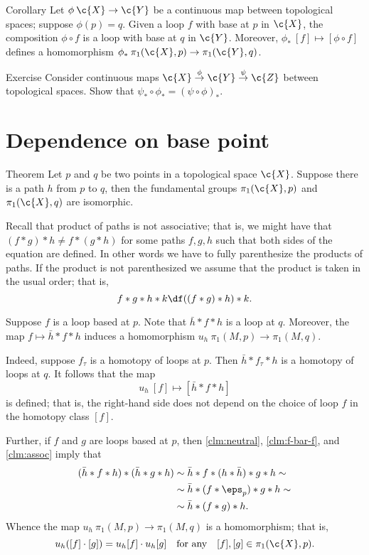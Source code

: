 \begin{thm}{Corollary}
Let $\phi\:\c{X}\to \c{Y}$ be a continuous map between topological spaces;
suppose $\phi(p)=q$.
Given a loop $f$ with base at $p$ in $\c{X}$, the composition $\phi\circ f$ is a loop with base at $q$ in $\c{Y}$.
Moreover, 
$\phi_*\:[f]\mapsto [\phi\circ f]$
defines a homomorphism $\phi_*\:\pi_1(\c{X},p)\to \pi_1(\c{Y},q)$.
\end{thm}



\begin{thm}{Exercise}
Consider continuous maps 
$\c{X}\stackrel{\phi}{\to}\c{Y}\stackrel{\psi}{\to}\c{Z}$ between topological spaces.
Show that $\psi_*\circ\phi_*=(\psi\circ\phi)_*$.
\end{thm}

\section{Dependence on base point}

\begin{thm}{Theorem}
Let $p$ and $q$ be two points in a topological space $\c{X}$.
Suppose there is a path $h$ from $p$ to $q$, then 
the fundamental groups $\pi_1(\c{X},p)$ and $\pi_1(\c{X},q)$ are isomorphic.
\end{thm}

Recall that product of paths is not associative;
that is, we might have that $(f*g)*h\ne f*(g*h)$ for some paths $f,g,h$ such that both sides of the equation are defined.
In other words we have to fully parenthesize the products of paths.
If the product is not parenthesized we assume that the product is taken in the usual order;
that is,
\[f*g*h*k\df((f*g)*h)*k.\]

Suppose $f$ is a loop based at $p$.
Note that $\bar h*f*h$ is a loop at $q$.
Moreover, the map $f\mapsto \bar h*f*h$ induces a homomorphism $u_h\:\pi_1(M,p)\to\pi_1(M,q)$.

Indeed, suppose $f_\tau$ is a homotopy of loops at $p$.
Then $\bar h*f_\tau*h$ is a homotopy of loops at $q$.
It follows that the map 
\[u_h\:[f]\mapsto [\bar h*f*h]\]
is defined; that is, the right-hand side does not depend on the choice of loop $f$ in the homotopy class $[f]$. 

Further, if $f$ and $g$ are loops based at $p$, then \ref{clm:neutral}, \ref{clm:f-bar-f}, and  \ref{clm:assoc} imply that
\begin{align*}
(\bar h*f*h)*(\bar h*g*h)&\sim \bar h*f*(h*\bar h)*g*h\sim
\\
&\sim \bar h*(f*\eps_p)*g*h\sim 
\\
&\sim \bar h*(f*g)*h.
\end{align*}
Whence the map $u_h\:\pi_1(M,p)\to \pi_1(M,q)$ is a homomorphism;
that is, 
\[u_h([f]\cdot [g])=u_h[f]\cdot u_h[g]\quad\text{for any}\quad [f],[g]\in \pi_1(\c{X},p).\]

